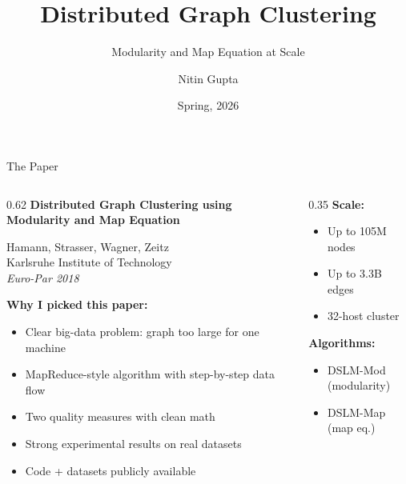 \documentclass[aspectratio=169]{beamer}
\title{Distributed Graph Clustering}
\subtitle{Modularity and Map Equation at Scale}
\author{Nitin Gupta}
\institute{CSC 502 -- Systems for Massive Datasets \\ University of Victoria}
\date{Spring, 2026}
\begin{document}
\begin{frame}
  \titlepage
\end{frame}

\begin{frame}{The Paper}
  \begin{columns}[T]
    \begin{column}{0.62\textwidth}
      \textbf{Distributed Graph Clustering using Modularity and Map Equation}

      \smallskip
      Hamann, Strasser, Wagner, Zeitz \\
      Karlsruhe Institute of Technology \\
      \textit{Euro-Par 2018}

      \bigskip
      \textbf{Why I picked this paper:}
      \begin{itemize}
        \item Clear big-data problem: graph too large for one machine
        \item MapReduce-style algorithm with step-by-step data flow
        \item Two quality measures with clean math
        \item Strong experimental results on real datasets
        \item Code + datasets publicly available
      \end{itemize}
    \end{column}
    \begin{column}{0.35\textwidth}
      \vspace{0.5cm}
      \textbf{Scale:}
      \begin{itemize}
        \item Up to 105M nodes
        \item Up to 3.3B edges
        \item 32-host cluster
      \end{itemize}
      \bigskip
      \textbf{Algorithms:}
      \begin{itemize}
        \item DSLM-Mod (modularity)
        \item DSLM-Map (map eq.)
      \end{itemize}
    \end{column}
  \end{columns}
\end{frame}
\end{document}

